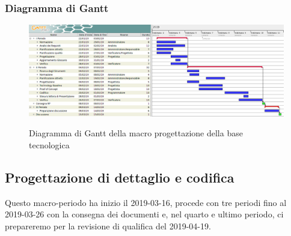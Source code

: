         \begin{landscape}
			\subsubsection{Diagramma di Gantt}
			\begin{figure}[H]
					\centering
					\includegraphics[scale=0.49]{img/Progettazione_della_base_tecnologica.png}\\
					\caption{Diagramma di Gantt della macro progettazione della base tecnologica}
			\end{figure}
		\end{landscape}
		\newpage

        \subsection{Progettazione di dettaglio e codifica}\label{PianificazioneDettaglio}
        Questo macro-periodo ha inizio il 2019-03-16, procede con tre periodi fino al 2019-03-26 con la consegna dei documenti e, nel
        quarto e ultimo periodo, ci prepareremo per la revisione di qualifica del 2019-04-19.

